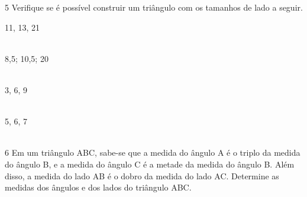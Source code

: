 \num{5} Verifique se é possível construir um triângulo com os tamanhos de
lado a seguir.

\begin{escolha}
\item 11, 13, 21  \\ \\
\item 8,5; 10,5; 20  \\ \\
\item 3, 6, 9  \\ \\
\item 5, 6, 7  \\ \\
\end{escolha}


\num{6} Em um triângulo ABC, sabe-se que a medida do ângulo A é o triplo da
medida do ângulo B, e a medida do ângulo C é a metade da medida do
ângulo B. Além disso, a medida do lado AB é o dobro da medida do lado
AC. Determine as medidas dos ângulos e dos lados do triângulo ABC.

